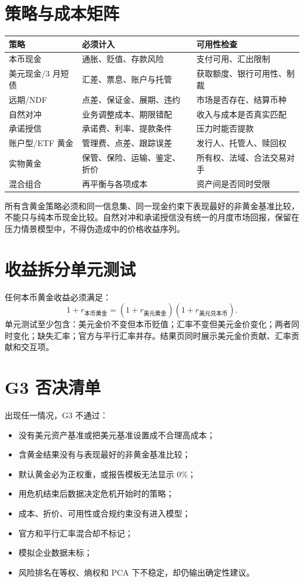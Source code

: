 \documentclass[UTF8,12pt,openany]{ctexbook}
\begin{document}
\section{策略与成本矩阵}
\begin{longtable}{p{3.2cm}p{4.5cm}p{5.4cm}}
\toprule
\textbf{策略} & \textbf{必须计入} & \textbf{可用性检查}\\
\midrule
本币现金 & 通胀、贬值、存款风险 & 支付可用、汇出限制\\
美元现金/3 月短债 & 汇差、票息、账户与托管 & 获取额度、银行可用性、制裁\\
远期/NDF & 点差、保证金、展期、违约 & 市场是否存在、结算币种\\
自然对冲 & 业务调整成本、期限错配 & 收入与成本是否真实匹配\\
承诺授信 & 承诺费、利率、提款条件 & 压力时能否提款\\
账户型/ETF 黄金 & 管理费、点差、跟踪误差 & 发行人、托管人、赎回权\\
实物黄金 & 保管、保险、运输、鉴定、折价 & 所有权、法域、合法交易对手\\
混合组合 & 再平衡与各项成本 & 资产间是否同时受限\\
\bottomrule
\end{longtable}

所有含黄金策略必须和同一信息集、同一现金约束下表现最好的非黄金基准比较，不能只与纯本币现金比较。自然对冲和承诺授信没有统一的月度市场回报，保留在压力情景模型中，不得伪造成中的价格收益序列。

\section{收益拆分单元测试}
任何本币黄金收益必须满足：
\[
1+r_{\text{本币黄金}}=(1+r_{\text{美元黄金}})(1+r_{\text{美元兑本币}}).
\]
单元测试至少包含：美元金价不变但本币贬值；汇率不变但美元金价变化；两者同时变化；缺失汇率；官方与平行汇率并存。结果页同时展示美元金价贡献、汇率贡献和交互项。

\section{G3 否决清单}
出现任一情况，G3 不通过：

\begin{itemize}
  \item 没有美元资产基准或把美元基准设置成不合理高成本；
  \item 含黄金结果没有与表现最好的非黄金基准比较；
  \item 默认黄金必为正权重，或报告模板无法显示 0\%；
  \item 用危机结束后数据决定危机开始时的策略；
  \item 成本、折价、可用性或合规约束没有进入模型；
  \item 官方和平行汇率混合却不标记；
  \item 模拟企业数据未标；
  \item 风险排名在等权、熵权和 PCA 下不稳定，却仍输出确定性建议。
\end{itemize}
\end{document}

